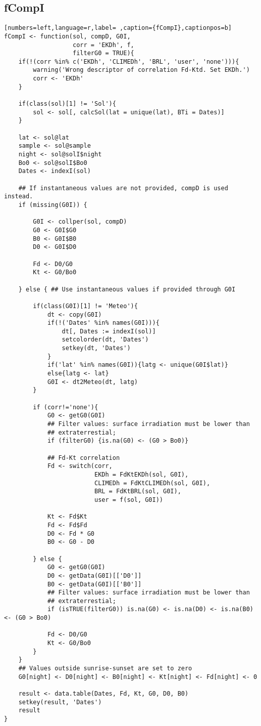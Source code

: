 \subsection{fCompI}
\label{sec:org4ce70af}
\begin{lstlisting}[numbers=left,language=r,label= ,caption={fCompI},captionpos=b]
fCompI <- function(sol, compD, G0I,
                   corr = 'EKDh', f,
                   filterG0 = TRUE){
    if(!(corr %in% c('EKDh', 'CLIMEDh', 'BRL', 'user', 'none'))){
        warning('Wrong descriptor of correlation Fd-Ktd. Set EKDh.')
        corr <- 'EKDh'
    }

    if(class(sol)[1] != 'Sol'){
        sol <- sol[, calcSol(lat = unique(lat), BTi = Dates)]
    }

    lat <- sol@lat
    sample <- sol@sample
    night <- sol@solI$night
    Bo0 <- sol@solI$Bo0
    Dates <- indexI(sol)

    ## If instantaneous values are not provided, compD is used instead.
    if (missing(G0I)) { 

        G0I <- collper(sol, compD)
        G0 <- G0I$G0
        B0 <- G0I$B0
        D0 <- G0I$D0

        Fd <- D0/G0
        Kt <- G0/Bo0

    } else { ## Use instantaneous values if provided through G0I

        if(class(G0I)[1] != 'Meteo'){
            dt <- copy(G0I)
            if(!('Dates' %in% names(G0I))){
                dt[, Dates := indexI(sol)]
                setcolorder(dt, 'Dates')
                setkey(dt, 'Dates')
            }
            if('lat' %in% names(G0I)){latg <- unique(G0I$lat)}
            else{latg <- lat}
            G0I <- dt2Meteo(dt, latg)
        }

        if (corr!='none'){
            G0 <- getG0(G0I)
            ## Filter values: surface irradiation must be lower than
            ## extraterrestial; 
            if (filterG0) {is.na(G0) <- (G0 > Bo0)}

            ## Fd-Kt correlation
            Fd <- switch(corr,
                         EKDh = FdKtEKDh(sol, G0I),
                         CLIMEDh = FdKtCLIMEDh(sol, G0I),
                         BRL = FdKtBRL(sol, G0I), 
                         user = f(sol, G0I))

            Kt <- Fd$Kt
            Fd <- Fd$Fd
            D0 <- Fd * G0
            B0 <- G0 - D0

        } else { 
            G0 <- getG0(G0I)
            D0 <- getData(G0I)[['D0']]
            B0 <- getData(G0I)[['B0']]
            ## Filter values: surface irradiation must be lower than
            ## extraterrestial; 
            if (isTRUE(filterG0)) is.na(G0) <- is.na(D0) <- is.na(B0) <- (G0 > Bo0)

            Fd <- D0/G0
            Kt <- G0/Bo0
        }
    }
    ## Values outside sunrise-sunset are set to zero
    G0[night] <- D0[night] <- B0[night] <- Kt[night] <- Fd[night] <- 0

    result <- data.table(Dates, Fd, Kt, G0, D0, B0)
    setkey(result, 'Dates')
    result
}
\end{lstlisting}
